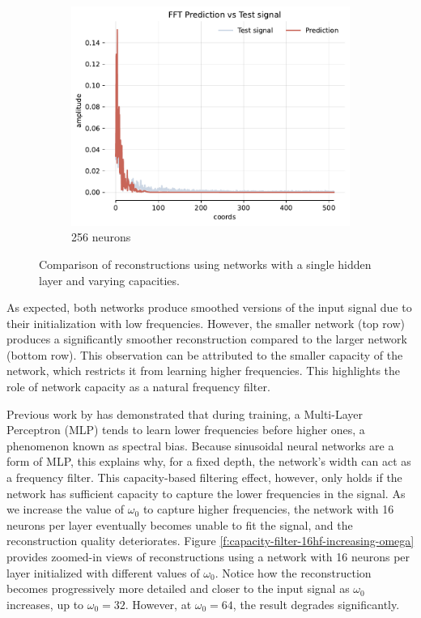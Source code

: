 \begin{figure}[h]
\begin{subfigure}[b]{0.32\textwidth}
        \centering
        \includegraphics[width=\textwidth]{img/ch4/fft-1hl-256hf-2hz.pdf}
        \caption{256 neurons}
        \label{fig:fft-1hl-256hf-2hz}
    \end{subfigure}
    \caption{Comparison of reconstructions using networks with a single hidden layer and varying capacities.}
    \label{f:capacity-filter-16-hf-256}
\end{figure}

As expected, both networks produce smoothed versions of the input signal due to their initialization with low frequencies. However, the smaller network (top row) produces a significantly smoother reconstruction compared to the larger network (bottom row). This observation can be attributed to the smaller capacity of the network, which restricts it from learning higher frequencies. This highlights the role of network capacity as a natural frequency filter.

Previous work by \cite{Rahaman2018O} has demonstrated that during training, a Multi-Layer Perceptron (MLP) tends to learn lower frequencies before higher ones, a phenomenon known as spectral bias. Because sinusoidal neural networks are a form of MLP, this explains why, for a fixed depth, the network's width can act as a frequency filter. This capacity-based filtering effect, however, only holds if the network has sufficient capacity to capture the lower frequencies in the signal. As we increase the value of $\omega_0$ to capture higher frequencies, the network with 16 neurons per layer eventually becomes unable to fit the signal, and the reconstruction quality deteriorates. Figure \ref{f:capacity-filter-16hf-increasing-omega} provides zoomed-in views of reconstructions using a network with 16 neurons per layer initialized with different values of $\omega_0$. Notice how the reconstruction becomes progressively more detailed and closer to the input signal as $\omega_0$ increases, up to $\omega_0 = 32$. However, at $\omega_0=64$, the result degrades significantly.


